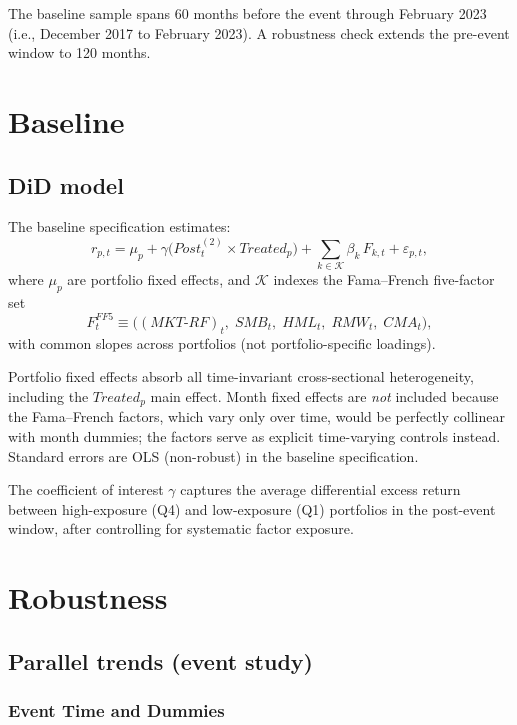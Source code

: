 \documentclass[11pt]{article}
\begin{document}
The baseline sample spans 60 months before the event through February 2023 (i.e., December 2017 to February 2023). A robustness check extends the pre-event window to 120 months.

\section{Baseline}

\subsection{DiD model}

The baseline specification estimates:
\begin{equation}
  r_{p,t}
  =
  \mu_p
  +
  \gamma\Big(Post^{(2)}_t \times Treated_p\Big)
  +
  \sum_{k \in \mathcal{K}}
  \beta_{k}\,F_{k,t}
  +
  \varepsilon_{p,t},
  \label{eq:baseline}
\end{equation}
where $\mu_p$ are portfolio fixed effects, and $\mathcal{K}$ indexes the Fama--French five-factor set
\begin{equation}
  F^{FF5}_t
  \equiv
  \big((MKT\text{-}RF)_t,\; SMB_t,\; HML_t,\; RMW_t,\; CMA_t\big),
\end{equation}
with common slopes across portfolios (not portfolio-specific loadings).

Portfolio fixed effects absorb all time-invariant cross-sectional heterogeneity, including the $Treated_p$ main effect. Month fixed effects are \emph{not} included because the Fama--French factors, which vary only over time, would be perfectly collinear with month dummies; the factors serve as explicit time-varying controls instead. Standard errors are OLS (non-robust) in the baseline specification.

The coefficient of interest $\gamma$ captures the average differential excess return between high-exposure (Q4) and low-exposure (Q1) portfolios in the post-event window, after controlling for systematic factor exposure.

\section{Robustness}

\subsection{Parallel trends (event study)}

\subsubsection{Event Time and Dummies}
\end{document}
